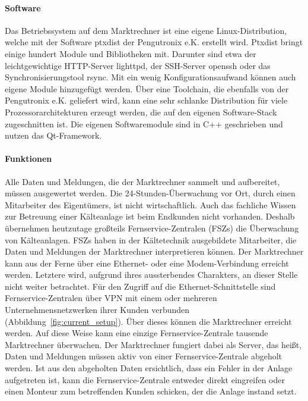 \documentclass[11pt,a4paper]{report}
\begin{document}
\paragraph{Software}

Das Betriebssystem auf dem Marktrechner ist eine eigene Linux-Distribu\-tion, welche mit der Software ptxdist der Pengutronix e.K. erstellt wird. Ptxdist bringt einige hundert Module und Bibliotheken mit. Darunter sind etwa der leichtgewichtige HTTP-Server lighttpd, der SSH-Server openssh oder das Synchronisierungstool rsync. Mit ein wenig Konfigurationsaufwand können auch eigene Module hinzugefügt werden. Über eine Toolchain, die ebenfalls von der Pengutronix e.K. geliefert wird, kann eine sehr schlanke Distribution für viele Prozessorarchitekturen erzeugt werden, die auf den eigenen Software-Stack zugeschnitten ist. Die eigenen Softwaremodule sind in C++ geschrieben und nutzen das Qt-Framework. 

\paragraph{Funktionen} \label{para:architektur}

Alle Daten und Meldungen, die der Marktrechner sammelt und aufbereitet, müssen ausgewertet werden. Die 24-Stunden-Überwachung vor Ort, durch einen Mitarbeiter des Eigentümers, ist nicht wirtschaftlich. Auch das fachliche Wissen zur Betreuung einer Kälteanlage ist beim Endkunden nicht vorhanden. Deshalb übernehmen heutzutage großteils Fernservice-Zentralen (FSZs) die Überwachung von Kälteanlagen. FSZs haben in der Kältetechnik ausgebildete Mitarbeiter, die Daten und Meldungen der Marktrechner interpretieren können. Der Marktrechner kann aus der Ferne über eine Ethernet- oder eine Modem-Verbindung erreicht werden. Letztere wird, aufgrund ihres aussterbendes Charakters, an dieser Stelle nicht weiter betrachtet. Für den Zugriff auf die Ethernet-Schnittstelle sind Fernservice-Zentralen über VPN mit einem oder mehreren Unternehmensnetzwerken ihrer Kunden verbunden (Abbildung~\ref{fig:current_setup}). Über dieses können die Marktrechner erreicht werden. Auf diese Weise kann eine einzige Fernservice-Zentrale tausende Marktrechner überwachen. Der Marktrechner fungiert dabei als Server, das heißt, Daten und Meldungen müssen aktiv von einer Fernservice-Zentrale abgeholt werden. Ist aus den abgeholten Daten ersichtlich, dass ein Fehler in der Anlage aufgetreten ist, kann die Fernservice-Zentrale entweder direkt eingreifen oder einen Monteur zum betreffenden Kunden schicken, der die Anlage instand setzt.
\end{document}
